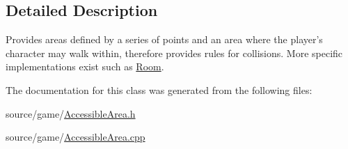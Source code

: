 \subsection{Detailed Description}
Provides areas defined by a series of points and an area where the player's character may walk within, therefore provides rules for collisions. More specific implementations exist such as \hyperlink{classRoom}{Room}. 

The documentation for this class was generated from the following files:\begin{DoxyCompactItemize}
\item 
source/game/\hyperlink{AccessibleArea_8h}{AccessibleArea.h}\item 
source/game/\hyperlink{AccessibleArea_8cpp}{AccessibleArea.cpp}\end{DoxyCompactItemize}
